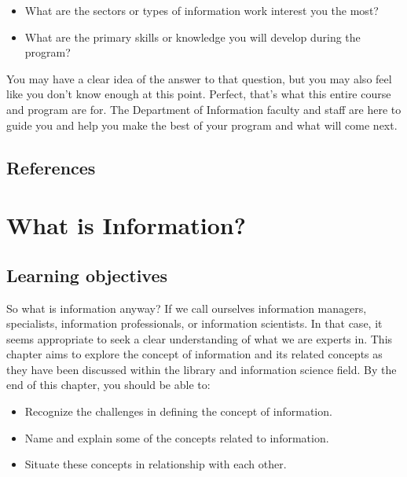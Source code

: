 \documentclass[
  letterpaper,
  DIV=11,
  numbers=noendperiod]{scrreprt}
\providecommand{\tightlist}{%
  \setlength{\itemsep}{0pt}\setlength{\parskip}{0pt}}
\begin{document}
\begin{itemize}
\tightlist
\item
  What are the sectors or types of information work interest you the
  most?
\item
  What are the primary skills or knowledge you will develop during the
  program?
\end{itemize}

You may have a clear idea of the answer to that question, but you may
also feel like you don't know enough at this point. Perfect, that's what
this entire course and program are for. The Department of Information
faculty and staff are here to guide you and help you make the best of
your program and what will come next.

\section{References}\label{references}


\chapter{What is Information?}\label{what-is-information}

\section{Learning objectives}\label{learning-objectives-1}

So what is information anyway? If we call ourselves information
managers, specialists, information professionals, or information
scientists. In that case, it seems appropriate to seek a clear
understanding of what we are experts in. This chapter aims to explore
the concept of information and its related concepts as they have been
discussed within the library and information science field. By the end
of this chapter, you should be able to:

\begin{itemize}
\tightlist
\item
  Recognize the challenges in defining the concept of information.
\item
  Name and explain some of the concepts related to information.
\item
  Situate these concepts in relationship with each other.
\end{itemize}
\end{document}
